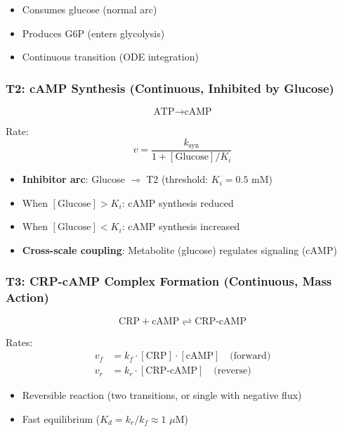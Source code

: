 \begin{itemize}
    \item Consumes glucose (normal arc)
    \item Produces G6P (enters glycolysis)
    \item Continuous transition (ODE integration)
\end{itemize}

\subsubsection{T2: cAMP Synthesis (Continuous, Inhibited by Glucose)}

\begin{equation}
\text{ATP} \to \text{cAMP}
\end{equation}

Rate:
\begin{equation}
v = \frac{k_{\text{syn}}}{1 + [\text{Glucose}]/K_i}
\end{equation}

\begin{itemize}
    \item \textbf{Inhibitor arc}: Glucose $\multimap$ T2 (threshold: $K_i = 0.5$ mM)
    \item When $[\text{Glucose}] > K_i$: cAMP synthesis reduced
    \item When $[\text{Glucose}] < K_i$: cAMP synthesis increased
    \item \textbf{Cross-scale coupling}: Metabolite (glucose) regulates signaling (cAMP)
\end{itemize}

\subsubsection{T3: CRP-cAMP Complex Formation (Continuous, Mass Action)}

\begin{equation}
\text{CRP} + \text{cAMP} \rightleftharpoons \text{CRP-cAMP}
\end{equation}

Rates:
\begin{align}
v_f &= k_f \cdot [\text{CRP}] \cdot [\text{cAMP}] \quad \text{(forward)} \\
v_r &= k_r \cdot [\text{CRP-cAMP}] \quad \text{(reverse)}
\end{align}

\begin{itemize}
    \item Reversible reaction (two transitions, or single with negative flux)
    \item Fast equilibrium ($K_d = k_r / k_f \approx 1$ $\mu$M)
\end{itemize}

